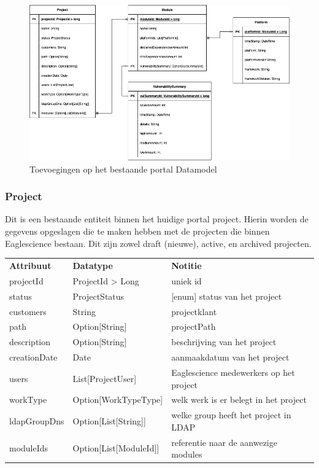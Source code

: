 \begin{figure}[bth]
    \myfloatalign
    \includegraphics[width=15cm]{gfx/SOUPAPI-PortalDM}
    \caption{Toevoegingen op het bestaande portal Datamodel}
    \label{fig:SOUP-portalDm}
\end{figure}
\clearpage

\subsubsection{Project}\label{subsubsec:portalProject}
Dit is een bestaande entiteit binnen het huidige portal project. Hierin worden de gegevens opgeslagen die te maken hebben met de projecten die binnen Eaglescience bestaan. Dit zijn zowel draft (nieuwe), active, en archived projecten.

\begin{tabular}{lll}
    \textbf{Attribuut} & \textbf{Datatype}      & \textbf{Notitie}                        \\
    projectId          & ProjectId > Long       & uniek id                                \\
    status             & ProjectStatus          & [enum] status van het project           \\
    customers          & String                 & projectklant                            \\
    path               & Option[String]         & projectPath                             \\
    description        & Option[String]         & beschrijving van het project            \\
    creationDate       & Date                   & aanmaakdatum van het project            \\
    users              & List[ProjectUser]      & Eaglescience medewerkers op het project \\
    workType           & Option[WorkTypeType]   & welk werk is er belegt in het project   \\
    ldapGroupDns       & Option[List[String]]   & welke group heeft het project in LDAP   \\
    moduleIds          & Option[List[ModuleId]] & referentie naar de aanwezige modules    \\
\end{tabular}

